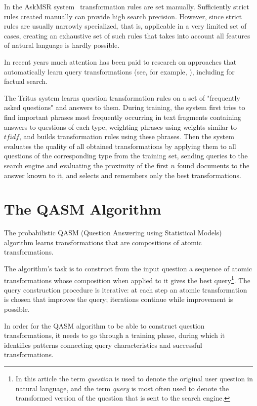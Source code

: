 \documentclass{article}
\begin{document}
In the AskMSR system~\cite{qa:dumais:redundancy} transformation rules are set manually.
Sufficiently strict rules created manually can provide high search precision.
However, since strict rules are usually narrowly specialized,
that is, applicable in a very limited set of cases,
creating an exhaustive set of such rules that takes into account all features of natural language
is hardly possible.

In recent years much attention has been paid
to research on approaches that automatically learn query transformations
(see, for example, \cite{glover:learning_qms}),
including for factual search.

The Tritus system \cite{qa:Tritus} learns question transformation rules
on a set of "frequently asked questions" and answers to them.
During training, the system first tries to find important phrases most frequently
occurring in text fragments containing answers to questions of each
type, weighting phrases using weights similar to $tfidf$, and builds
transformation rules using these phrases.
Then the system evaluates the quality of
all obtained transformations by applying them to all questions
of the corresponding type from the training set,
sending queries to the search engine and evaluating the proximity of the first
$n$ found documents to the answer known to it, and selects and
remembers only the best transformations.

\section{The QASM Algorithm}

The probabilistic QASM (Question Answering using Statistical Models)~\cite{qa:radev:qasm}
algorithm learns transformations that are compositions of atomic
transformations.

The algorithm's task is to construct from the input question a sequence of
atomic transformations whose composition when applied to it gives
the best query\footnote{In this article the term {\em question}
is used to denote the original user question in natural
language, and the term {\em query} is most often used to denote
the transformed version of the question
that is sent to the search engine.}.
The query construction procedure is iterative: at each step
an atomic transformation is chosen that improves the query; iterations
continue while improvement is possible.

In order for the QASM algorithm to be able to construct question transformations,
it needs to go through a training phase,
during which it identifies patterns
connecting query characteristics and successful transformations.
\end{document}
